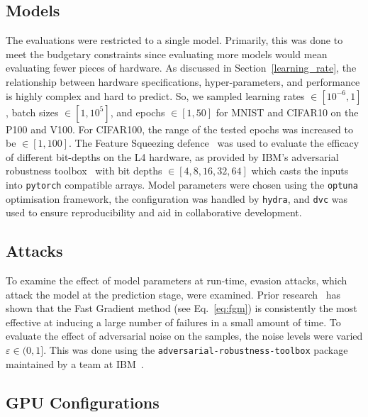 \documentclass[conference]{IEEEtran}
\begin{document}
{\subsection{Models}

The evaluations were restricted to a single model. Primarily, this was done to meet the budgetary constraints since evaluating more models would mean evaluating fewer pieces of hardware. As discussed in Section~\ref{learning_rate}, the relationship between hardware specifications, hyper-parameters, and performance is highly complex and hard to predict. So, we sampled learning rates $\in [10^{-6}, 1]$, batch sizes $\in [1, 10^5]$, and epochs $\in [1, 50]$ for MNIST and CIFAR10 on the P100 and V100. For CIFAR100, the range of the tested epochs was increased to be $\in [1, 100]$. The Feature Squeezing defence~\cite{feature_squeezing} was used to evaluate the efficacy of different bit-depths on the L4 hardware, as provided by IBM's adversarial robustness toolbox~\cite{art2018} with bit depths $\in [4,8,16,32,64]$ which casts the inputs into \texttt{pytorch} compatible arrays. Model parameters were chosen using the \texttt{optuna} optimisation framework, the configuration was handled by \texttt{hydra}, and \texttt{dvc} was used to ensure reproducibility and aid in collaborative development.


\subsection{Attacks}

To examine the effect of model parameters at run-time, evasion attacks, which attack the model at the prediction stage, were examined. Prior research~\cite{meyers,meyers_aft} has shown that the Fast Gradient method (see Eq.~\ref{eq:fgm}) is consistently the most effective at inducing a large number of failures in a small amount of time. To evaluate the effect of adversarial noise on the samples, the noise levels were varied $\varepsilon \in (0, 1]$. This was done using the \texttt{adversarial-robustness-toolbox} package maintained by a team at IBM~\cite{art2018}.


\subsection{GPU Configurations}

}
\end{document}
